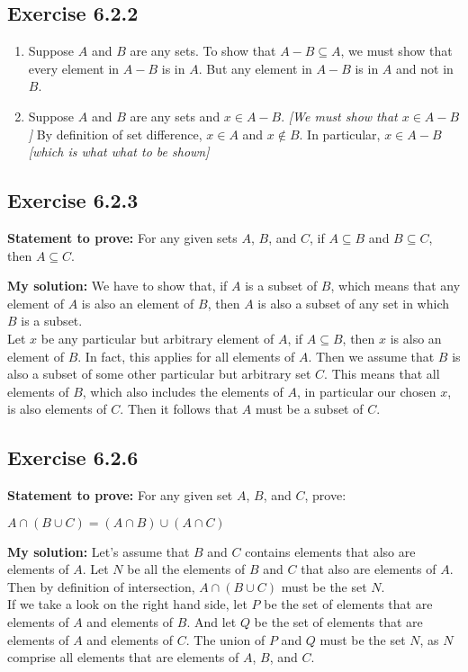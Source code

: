 \documentclass{report}
\newcommand{\cent}[1]{\begin{center}#1\end{center}}
\newcommand{\In}{\! \in \!}
\newcommand{\Prove}{\textbf{Statement to prove: }}
\newcommand{\solution}{\textbf{My solution: }}
\newcommand{\QED}{\boxed{}}
\newcommand{\Exercise}[1]{\subsection{Exercise #1}}
\newcommand{\defaultEnumerateLabel}{\textbf{\alph*.}}
\begin{document}
	\Exercise{6.2.2}
	
	\begin{enumerate}[label=\defaultEnumerateLabel]
		\item Suppose $A$ and $B$ are any sets. To show that $A-B \subseteq A$, we must show that every element in $A-B$ is in $A$. But any element in $A-B$ is in $A$ and not in $B$.
		
		\item Suppose $A$ and $B$ are any sets and $x\In A-B$. \textit{[We must show that $x \In A-B$]} By definition of set difference, $x \In A$ and $x \notin B$. In particular, $x \In A - B$ \textit{[which is what what to be shown]}
	\end{enumerate}

	\Exercise{6.2.3}
	
	\Prove
	For any given sets $A$, $B$, and $C$, if $A \subseteq B$ and $B \subseteq C$, then $A \subseteq C$. 
	
	\solution
	We have to show that, if $A$ is a subset of  $B$, which means that any element of $A$ is also an element of $B$, then $A$ is also a subset of any set in which $B$ is a subset.\\
	
	Let $x$ be any particular but arbitrary element of $A$, if $A \subseteq B$, then $x$ is also an element of $B$.  In fact, this applies for all elements of $A$. Then we assume that $B$ is also a subset of some other particular but arbitrary set $C$. This means that all elements of $B$, which also includes the elements of $A$, in particular our chosen $x$, is also elements of $C$. Then it follows that $A$ must be a subset of $C$.\\
	\QED 
	
	\Exercise{6.2.6}
	
	\Prove
	For any given set $A$, $B$, and $C$, prove:
	
	\cent{$A \cap (B \cup C) = (A \cap B) \cup (A \cap C)$}
	
	\solution
	Let's assume that $B$ and $C$ contains elements that also are elements of $A$. Let $N$ be all the elements of $B$ and $C$ that also are elements of $A$. Then by definition of intersection, $A \cap (B \cup C)$  must be the set $N$.\\
	
	If we take a look on the right hand side, let $P$ be the set of elements that are elements of $A$ and elements of $B$. And let $Q$ be the set of elements that are elements of $A$ and elements of $C$. The union of $P$ and $Q$ must be the set $N$, as $N$ comprise all elements that are elements of $A$, $B$, and $C$.\\
	\QED
	
\end{document}
